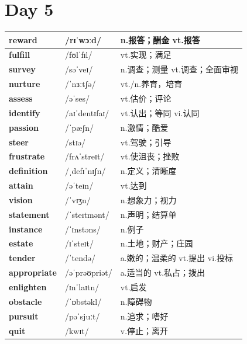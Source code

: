\documentclass[14pt,a4paper]{extarticle}
\begin{document}
\newpage
\section{Day 5}

\begin{longtable}{ p{} p{} p{} }
\hline
\endfirsthead
\hline
\endhead
\endfoot
\endlastfoot

\textbf{reward} & /rɪˈwɔːd/ & n.报答；酬金 \quad vt.报答 \\ \hline
\textbf{fulfill} & /fʊlˈfɪl/ & vt.实现；满足 \\ \hline
\textbf{survey} & /səˈveɪ/ & n.调查；测量 \quad vt.调查；全面审视 \\ \hline
\textbf{nurture} & /ˈnɜːtʃə/ & vt./n.养育，培育 \\ \hline
\textbf{assess} & /əˈses/ & vt.估价；评论 \\ \hline
\textbf{identify} & /aɪˈdentɪfaɪ/ & vt.认出；等同 \quad vi.认同 \\ \hline
\textbf{passion} & /ˈpæʃn/ & n.激情；酷爱 \\ \hline
\textbf{steer} & /stɪə/ & vt.驾驶；引导 \\ \hline
\textbf{frustrate} & /frʌˈstreɪt/ & vt.使沮丧；挫败 \\ \hline
\textbf{definition} & /ˌdefɪˈnɪʃn/ & n.定义；清晰度 \\ \hline
\textbf{attain} & /əˈteɪn/ & vt.达到 \\ \hline
\textbf{vision} & /ˈvɪʒn/ & n.想象力；视力 \\ \hline
\textbf{statement} & /ˈsteɪtmənt/ & n.声明；结算单 \\ \hline
\textbf{instance} & /ˈɪnstəns/ & n.例子 \\ \hline
\textbf{estate} & /ɪˈsteɪt/ & n.土地；财产；庄园 \\ \hline
\textbf{tender} & /ˈtendə/ & a.嫩的；温柔的 \quad vt.提出 \quad vi.投标 \\ \hline
\textbf{appropriate} & /əˈprəʊpriət/ & a.适当的 \quad vt.私占；拨出 \\ \hline
\textbf{enlighten} & /ɪnˈlaɪtn/ & vt.启发 \\ \hline
\textbf{obstacle} & /ˈɒbstəkl/ & n.障碍物 \\ \hline
\textbf{pursuit} & /pəˈsjuːt/ & n.追求；嗜好 \\ \hline
\textbf{quit} & /kwɪt/ & v.停止；离开 \\ \hline

\end{longtable}
\end{document}
